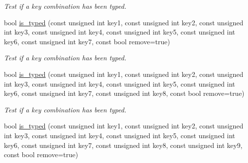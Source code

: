 \begin{DoxyCompactItemize}
\begin{DoxyCompactList}\small\item\em Test if a key combination has been typed. \item\end{DoxyCompactList}\item 
\hypertarget{structcimg__library_1_1_c_img_display_a20609780849f60357df10dc383e3f5a6}{
bool \hyperlink{structcimg__library_1_1_c_img_display_a20609780849f60357df10dc383e3f5a6}{is\_\-typed} (const unsigned int key1, const unsigned int key2, const unsigned int key3, const unsigned int key4, const unsigned int key5, const unsigned int key6, const unsigned int key7, const bool remove=true)}
\label{structcimg__library_1_1_c_img_display_a20609780849f60357df10dc383e3f5a6}

\begin{DoxyCompactList}\small\item\em Test if a key combination has been typed. \item\end{DoxyCompactList}\item 
\hypertarget{structcimg__library_1_1_c_img_display_afe41c8f4bc7532c61927681b6757c40e}{
bool \hyperlink{structcimg__library_1_1_c_img_display_afe41c8f4bc7532c61927681b6757c40e}{is\_\-typed} (const unsigned int key1, const unsigned int key2, const unsigned int key3, const unsigned int key4, const unsigned int key5, const unsigned int key6, const unsigned int key7, const unsigned int key8, const bool remove=true)}
\label{structcimg__library_1_1_c_img_display_afe41c8f4bc7532c61927681b6757c40e}

\begin{DoxyCompactList}\small\item\em Test if a key combination has been typed. \item\end{DoxyCompactList}\item 
\hypertarget{structcimg__library_1_1_c_img_display_a8aaa91cb0ac902168e6045c2ae0be165}{
bool \hyperlink{structcimg__library_1_1_c_img_display_a8aaa91cb0ac902168e6045c2ae0be165}{is\_\-typed} (const unsigned int key1, const unsigned int key2, const unsigned int key3, const unsigned int key4, const unsigned int key5, const unsigned int key6, const unsigned int key7, const unsigned int key8, const unsigned int key9, const bool remove=true)}
\label{structcimg__library_1_1_c_img_display_a8aaa91cb0ac902168e6045c2ae0be165}


\end{DoxyCompactItemize}
